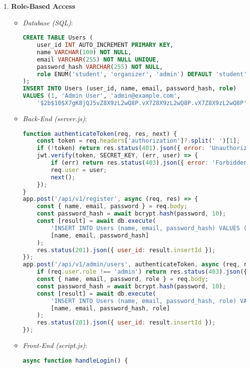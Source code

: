 \documentclass[12pt]{article}
\begin{document}
\begin{enumerate}
    \item \textbf{Role-Based Access}
        \begin{itemize}
            \item \textit{Database (SQL)}:
\begin{lstlisting}[language=SQL, caption={Users Table Definition}]
CREATE TABLE Users (
    user_id INT AUTO_INCREMENT PRIMARY KEY,
    name VARCHAR(100) NOT NULL,
    email VARCHAR(255) NOT NULL UNIQUE,
    password_hash VARCHAR(255) NOT NULL,
    role ENUM('student', 'organizer', 'admin') DEFAULT 'student'
);
INSERT INTO Users (user_id, name, email, password_hash, role) 
VALUES (1, 'Admin User', 'admin@example.com', 
    '$2b$10$X7gK8jQJ5vZ8X9zL2wQ8P.vX7Z8X9zL2wQ8P.vX7Z8X9zL2wQ8P', 'admin');
\end{lstlisting}
            \item \textit{Back-End (server.js)}:
\begin{lstlisting}[language=JavaScript, caption={Authentication and Role Check}]
function authenticateToken(req, res, next) {
    const token = req.headers['authorization']?.split(' ')[1];
    if (!token) return res.status(401).json({ error: 'Unauthorized' });
    jwt.verify(token, SECRET_KEY, (err, user) => {
        if (err) return res.status(403).json({ error: 'Forbidden' });
        req.user = user;
        next();
    });
}
app.post('/api/v1/register', async (req, res) => {
    const { name, email, password } = req.body;
    const password_hash = await bcrypt.hash(password, 10);
    const [result] = await db.execute(
        'INSERT INTO Users (name, email, password_hash) VALUES (?, ?, ?)',
        [name, email, password_hash]
    );
    res.status(201).json({ user_id: result.insertId });
});
app.post('/api/v1/admin/users', authenticateToken, async (req, res) => {
    if (req.user.role !== 'admin') return res.status(403).json({ error: 'Forbidden' });
    const { name, email, password, role } = req.body;
    const password_hash = await bcrypt.hash(password, 10);
    const [result] = await db.execute(
        'INSERT INTO Users (name, email, password_hash, role) VALUES (?, ?, ?, ?)',
        [name, email, password_hash, role]
    );
    res.status(201).json({ user_id: result.insertId });
});
\end{lstlisting}
            \item \textit{Front-End (script.js)}:
\begin{lstlisting}[language=JavaScript, caption={Login and Role-Based UI}]
async function handleLogin() {

\end{lstlisting}
\end{itemize}
\end{enumerate}
\end{document}
